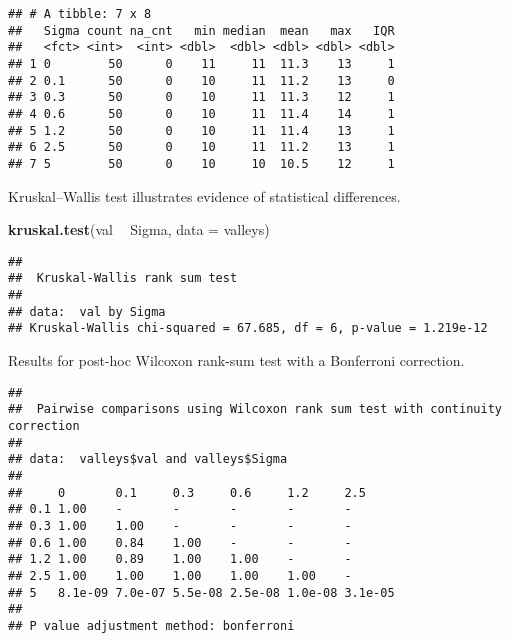 \documentclass[]{book}
\newenvironment{Shaded}{\begin{snugshade}}{\end{snugshade}}
\newcommand{\DataTypeTok}[1]{\textcolor[rgb]{0.13,0.29,0.53}{#1}}
\newcommand{\KeywordTok}[1]{\textcolor[rgb]{0.13,0.29,0.53}{\textbf{#1}}}
\newcommand{\NormalTok}[1]{#1}
\newcommand{\OperatorTok}[1]{\textcolor[rgb]{0.81,0.36,0.00}{\textbf{#1}}}
\newcommand{\OtherTok}[1]{\textcolor[rgb]{0.56,0.35,0.01}{#1}}
\newcommand{\StringTok}[1]{\textcolor[rgb]{0.31,0.60,0.02}{#1}}
\begin{document}
\begin{verbatim}
## # A tibble: 7 x 8
##   Sigma count na_cnt   min median  mean   max   IQR
##   <fct> <int>  <int> <dbl>  <dbl> <dbl> <dbl> <dbl>
## 1 0        50      0    11     11  11.3    13     1
## 2 0.1      50      0    10     11  11.2    13     0
## 3 0.3      50      0    10     11  11.3    12     1
## 4 0.6      50      0    10     11  11.4    14     1
## 5 1.2      50      0    10     11  11.4    13     1
## 6 2.5      50      0    10     11  11.2    13     1
## 7 5        50      0    10     10  10.5    12     1
\end{verbatim}

Kruskal--Wallis test illustrates evidence of statistical differences.

\begin{Shaded}
\begin{Highlighting}[]
\KeywordTok{kruskal.test}\NormalTok{(val }\OperatorTok{~}\StringTok{ }\NormalTok{Sigma, }\DataTypeTok{data =}\NormalTok{ valleys)}
\end{Highlighting}
\end{Shaded}

\begin{verbatim}
## 
##  Kruskal-Wallis rank sum test
## 
## data:  val by Sigma
## Kruskal-Wallis chi-squared = 67.685, df = 6, p-value = 1.219e-12
\end{verbatim}

Results for post-hoc Wilcoxon rank-sum test with a Bonferroni correction.

\begin{Shaded}
\end{Shaded}

\begin{verbatim}
## 
##  Pairwise comparisons using Wilcoxon rank sum test with continuity correction 
## 
## data:  valleys$val and valleys$Sigma 
## 
##     0       0.1     0.3     0.6     1.2     2.5    
## 0.1 1.00    -       -       -       -       -      
## 0.3 1.00    1.00    -       -       -       -      
## 0.6 1.00    0.84    1.00    -       -       -      
## 1.2 1.00    0.89    1.00    1.00    -       -      
## 2.5 1.00    1.00    1.00    1.00    1.00    -      
## 5   8.1e-09 7.0e-07 5.5e-08 2.5e-08 1.0e-08 3.1e-05
## 
## P value adjustment method: bonferroni
\end{verbatim}
\end{document}
